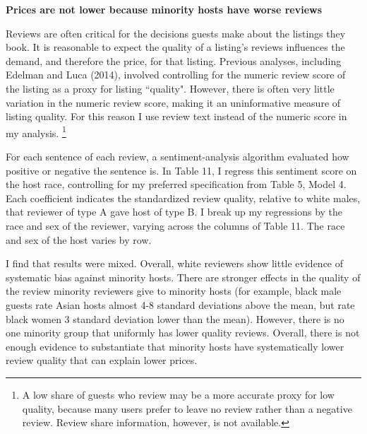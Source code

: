 \textbf{Prices are not lower because minority hosts have worse reviews} 

Reviews are often critical for the decisions guests make about the listings they book. It is reasonable to expect the quality of a listing's reviews influences the demand, and therefore the price, for that listing. Previous analyses, including Edelman and Luca (2014), involved controlling for the numeric review score of the listing as a proxy for listing ``quality". However, there is often very little variation in the numeric review score, making it an uninformative measure of listing quality. For this reason I use review text instead of the numeric score in my analysis. %
	\footnote{A low share of guests who review may be a more accurate proxy for low quality, because many users prefer to leave no review rather than a negative review. Review share information, however, is not available.} 

For each sentence of each review, a sentiment-analysis algorithm evaluated how positive or negative the sentence is. In Table 11, I regress this sentiment score on the host race, controlling for my preferred specification from Table 5, Model 4. Each coefficient indicates the standardized review quality, relative to white males, that reviewer of type A gave host of type B. I break up my regressions by the race and sex of the reviewer, varying across the columns of Table 11. The race and sex of the host varies by row. 


I find that results were mixed. Overall, white reviewers show little evidence of systematic bias against minority hosts. There are stronger effects in the quality of the review minority reviewers give to minority hosts (for example, black male guests rate Asian hosts almost 4-8 standard deviations above the mean, but rate black women 3 standard deviation lower than the mean). However, there is no one minority group that uniformly has lower quality reviews. Overall, there is not enough evidence to substantiate that minority hosts have systematically lower review quality that can explain lower prices. 

